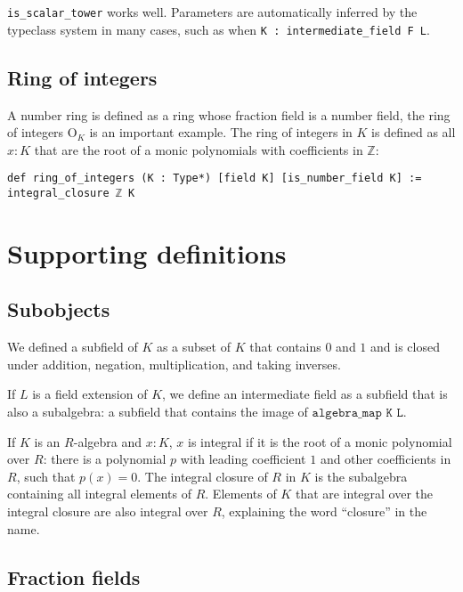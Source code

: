 \documentclass{lipics-v2021}
\newcommand{\lean}[1]{\texttt{#1}\xspace} %
\newcommand{\OK}{\mathrm{O}_K}
\newcommand{\Z}{\mathbb{Z}}
\begin{document}
\lean{is\_scalar\_tower} works well.
Parameters are automatically inferred by the typeclass system in many cases,
such as when \lean{K : intermediate\_field F L}.

\subsection{Ring of integers}

A number ring is defined as a ring whose fraction field is a number field, the ring of integers $\OK$ is an important example.
The ring of integers in $K$ is defined as all $x : K$ that are the root of a monic polynomials with coefficients in $\Z$:
\begin{lstlisting}
def ring_of_integers (K : Type*) [field K] [is_number_field K] :=
integral_closure ℤ K
\end{lstlisting}

\section{Supporting definitions}


\subsection{Subobjects}

We defined a subfield of $K$ as a subset of $K$ that contains $0$ and $1$ and is closed under addition, negation, multiplication, and taking inverses.

If $L$ is a field extension of $K$, we define an intermediate field as a subfield that is also a subalgebra: a subfield that contains the image of $\lean{algebra\_map K L}$.

If $K$ is an $R$-algebra and $x : K$, $x$ is integral if it is the root of a monic polynomial over $R$: there is a polynomial $p$ with leading coefficient $1$ and other coefficients in $R$, such that $p(x) = 0$.
The integral closure of $R$ in $K$ is the subalgebra containing all integral elements of $R$.
Elements of $K$ that are integral over the integral closure are also integral over $R$, explaining the word ``closure'' in the name.

\subsection{Fraction fields}
\end{document}
